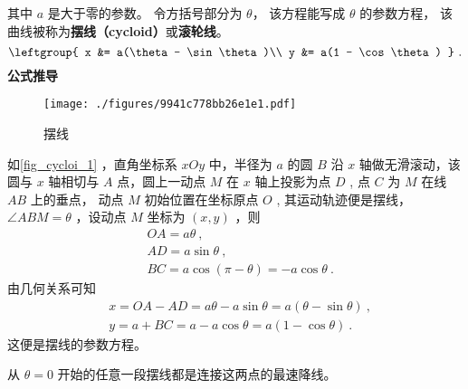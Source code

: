 
\begin{issues}
\issueDraft
\end{issues}

其中 $a$ 是大于零的参数。 令方括号部分为 $\theta$， 该方程能写成 $\theta$ 的参数方程， 该曲线被称为\textbf{摆线（cycloid）}或\textbf{滚轮线}。 %
\begin{equation}
\leftgroup{
x &= a(\theta - \sin\theta)\\
y &= a(1 - \cos\theta)
}~.\end{equation}
\textbf{公式推导}
\begin{figure}[ht]
\centering
\texttt{[image: ./figures/9941c778bb26e1e1.pdf]}
\caption{摆线} \label{fig_cycloi_1}
\end{figure}
如\autoref{fig_cycloi_1} ，直角坐标系 $xOy$ 中，半径为 $a$ 的圆 $B$ 沿 $x$ 轴做无滑滚动，该圆与 $x$ 轴相切与 $A$ 点，圆上一动点 $M$ 在 $x$ 轴上投影为点 $D$ , 点 $C$ 为 $M$ 在线 $AB$ 上的垂点， 动点 $M$ 初始位置在坐标原点 $O$ , 其运动轨迹便是摆线， $\angle ABM=\theta$ ，设动点 $M$ 坐标为 $(x,y)$ ，则
\begin{equation}
\begin{aligned}
&OA=a\theta ~,\\
&AD=a\sin\theta~,\\
&BC=a\cos(\pi-\theta)=-a \cos\theta~.
\end{aligned}
\end{equation}
由几何关系可知
\begin{equation}
\begin{aligned}
&x=OA-AD=a\theta-a\sin\theta=a(\theta-\sin\theta)~,\\
&y=a+BC=a-a\cos\theta=a(1-\cos\theta)~.
\end{aligned}
\end{equation}
这便是摆线的参数方程。


从 $\theta = 0$ 开始的任意一段摆线都是连接这两点的最速降线。 
